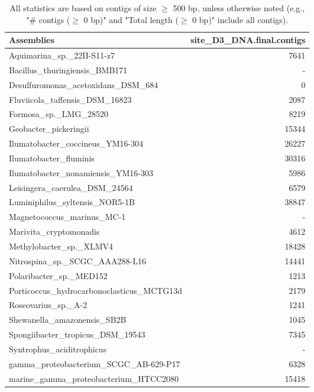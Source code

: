 \documentclass[12pt,a4paper]{article}
\begin{document}
\begin{table}[ht]
\begin{center}
\caption{All statistics are based on contigs of size $\geq$ 500 bp, unless otherwise noted (e.g., "\# contigs ($\geq$ 0 bp)" and "Total length ($\geq$ 0 bp)" include all contigs).}
\begin{tabular}{|l*{1}{|r}|}
\hline
Assemblies & site\_D3\_DNA.final.contigs \\ \hline
Aquimarina\_sp.\_22II-S11-z7 & 7641 \\ \hline
Bacillus\_thuringiensis\_BMB171 & - \\ \hline
Desulfuromonas\_acetoxidans\_DSM\_684 & 0 \\ \hline
Fluviicola\_taffensis\_DSM\_16823 & 2087 \\ \hline
Formosa\_sp.\_LMG\_28520 & 8219 \\ \hline
Geobacter\_pickeringii & 15344 \\ \hline
Ilumatobacter\_coccineus\_YM16-304 & 26227 \\ \hline
Ilumatobacter\_fluminis & 30316 \\ \hline
Ilumatobacter\_nonamiensis\_YM16-303 & 5986 \\ \hline
Leisingera\_caerulea\_DSM\_24564 & 6579 \\ \hline
Luminiphilus\_syltensis\_NOR5-1B & 38847 \\ \hline
Magnetococcus\_marinus\_MC-1 & - \\ \hline
Marivita\_cryptomonadis & 4612 \\ \hline
Methylobacter\_sp.\_XLMV4 & 18428 \\ \hline
Nitrospina\_sp.\_SCGC\_AAA288-L16 & 14441 \\ \hline
Polaribacter\_sp.\_MED152 & 1213 \\ \hline
Porticoccus\_hydrocarbonoclasticus\_MCTG13d & 2179 \\ \hline
Roseovarius\_sp.\_A-2 & 1241 \\ \hline
Shewanella\_amazonensis\_SB2B & 1045 \\ \hline
Spongiibacter\_tropicus\_DSM\_19543 & 7345 \\ \hline
Syntrophus\_aciditrophicus & - \\ \hline
gamma\_proteobacterium\_SCGC\_AB-629-P17 & 6328 \\ \hline
marine\_gamma\_proteobacterium\_HTCC2080 & 15418 \\ \hline
\end{tabular}
\end{center}
\end{table}
\end{document}
